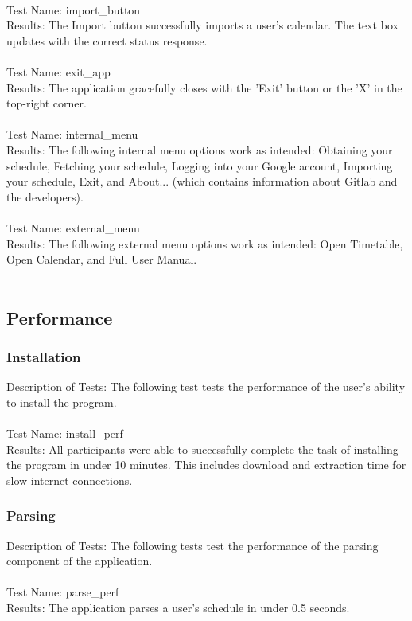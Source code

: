 \documentclass[12pt, titlepage]{article}
\begin{document}
	\\	
	Test Name: import\_button\\
	Results: The Import button successfully imports a user's calendar. The text box updates with the correct status response.\\
	\\
	Test Name: exit\_app\\
	Results: The application gracefully closes with the 'Exit' button or the 'X' in the top-right corner.\\
	\\
\newpage	 %
	Test Name: internal\_menu\\
	Results: The following internal menu options work as intended: Obtaining your schedule, Fetching your schedule, Logging into your Google account, Importing your schedule, Exit, and About... (which contains information about Gitlab and the developers).\\
	\\
	Test Name: external\_menu\\
	Results: The following external menu options work as intended: Open Timetable, Open Calendar, and Full User Manual.\\
	\\		

		
\subsection{Performance}
	\subsubsection{Installation}
	Description of Tests: The following test tests the performance of the user's ability to install the program.\\
	\\
	Test Name: install\_perf\\
	Results: All participants were able to successfully complete the task of installing the program in under 10 minutes. This includes download and extraction time for slow internet connections.
	
	\subsubsection{Parsing}
	Description of Tests: The following tests test the performance of the parsing component of the application.\\
	\\
	Test Name: parse\_perf\\
	Results: The application parses a user's schedule in under 0.5 seconds.
	
\end{document}
